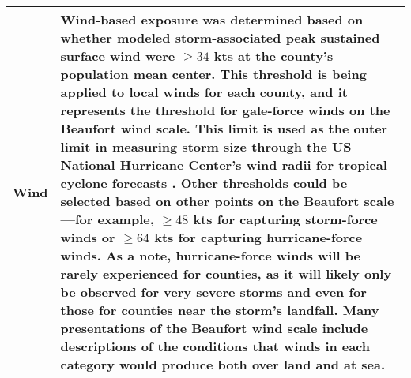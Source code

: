 \begin{longtable}{lp{35em}}
\textbf{Wind} & Wind-based exposure was determined based on whether modeled storm-associated peak sustained surface wind were $\ge34$ kts at the county’s population mean center. This threshold is being applied to local winds for each county, and it represents the threshold for gale-force winds on the Beaufort wind scale. This limit is used as the outer limit in measuring storm size through the US National Hurricane Center's wind radii for tropical cyclone forecasts \parencite{cangialosi2016examination}. Other thresholds could be selected based on other points on the Beaufort scale---for example, $\ge48$ kts for capturing storm-force winds or $\ge64$ kts for capturing hurricane-force winds. As a note, hurricane-force winds will be rarely experienced for counties, as it will likely only be observed for very severe storms and even for those for counties near the storm's landfall. Many presentations of the Beaufort wind scale include descriptions of the conditions that winds in each category would produce both over land and at sea.\\
\hline
\end{longtable}